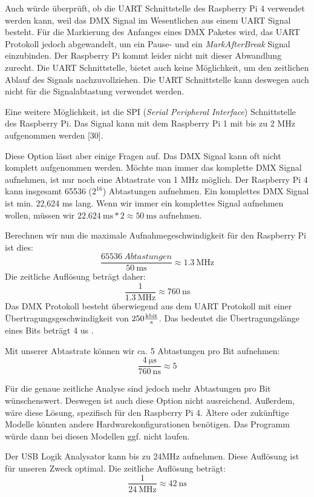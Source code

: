 Auch würde überprüft, ob die UART Schnittstelle des Raspberry Pi 4 verwendet werden kann, weil das DMX Signal im Wesentlichen aus einem UART Signal besteht. Für die Markierung des Anfanges eines DMX Paketes wird, das UART Protokoll jedoch abgewandelt, um ein Pause- und ein \emph{MarkAfterBreak} Signal einzubinden. Der Raspberry Pi kommt leider nicht mit dieser Abwandlung zurecht\cite[S.20]{RaspberryPiDmxInterface}. Die UART Schnittstelle, bietet auch keine Möglichkeit, um den zeitlichen Ablauf des Signals nachzuvollziehen. Die UART Schnittstelle kann deswegen auch nicht für die Signalabtastung verwendet werden.

Eine weitere Möglichkeit, ist die SPI (\emph{Serial Peripheral Interface}) Schnittstelle des Raspberry Pi. Das Signal kann mit dem Raspberry Pi 1 mit bis zu 2 MHz aufgenommen werden \cite{RaspberryPiDmxInterface}[30].

Diese Option lässt aber einige Fragen auf. Das DMX Signal kann oft nicht komplett aufgenommen werden. Möchte man immer das komplette DMX Signal aufnehmen, ist nur noch eine Abtastrate von 1 MHz möglich. Der Raspberry Pi 4 kann insgesamt 65536 ($2^{16}$) Abtastungen aufnehmen. Ein komplettes DMX Signal ist min. 22,624 ms lang\cite{DMXWikiTiming}. Wenn wir immer ein komplettes Signal aufnehmen wollen, müssen wir $  \SI{22.624}{\ms}
 * 2 \approx \SI{50}{\ms}$ aufnehmen.



Berechnen wir nun die maximale Aufnahmegeschwindigkeit für den Raspberry Pi ist dies:
\[\frac{\SI{65536}{Abtastungen}}{\SI{50}{\ms}} \approx \SI{1.3}{\mega\hertz}\]
Die zeitliche Auflösung beträgt daher:
\[ \frac{1}{\SI{1.3}{\mega\hertz}} \approx \SI{760}{\ns}\]
Das DMX Protokoll besteht überwiegend aus dem UART Protokoll mit einer Übertragungsgeschwindigkeit von $250 \frac{\SI{}{\kilo\bit}}{\SI{}{\s}}$. Das bedeutet die Übertragungslänge eines Bits beträgt 4 us \cite{DMXWikiTiming}.

Mit unserer Abtastrate können wir ca. 5 Abtastungen pro Bit aufnehmen:
\[\frac{\SI{4}{\us}}{\SI{760}{\ns}} \approx 5\]

Für die genaue zeitliche Analyse sind jedoch mehr Abtastungen pro Bit wünschenswert. Deswegen ist auch diese Option nicht ausreichend. Außerdem, wäre diese Lösung, spezifisch für den Raspberry Pi 4. Ältere oder zukünftige Modelle könnten andere Hardwarekonfigurationen benötigen. Das Programm würde dann bei diesen Modellen ggf. nicht laufen.

Der USB Logik Analysator kann bis zu 24MHz aufnehmen. Diese Auflösung ist für unseren Zweck optimal. Die zeitliche Auflösung beträgt:
\[ \frac{1}{\SI{24}{\mega\hertz}} \approx \SI{42}{\ns}\]

